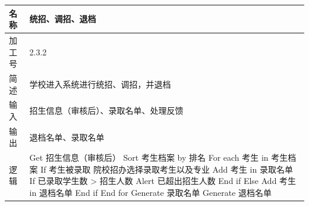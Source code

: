 \documentclass[CJK,utf8]{ctexrep}
\begin{document}
\begin{tabularx}{0.85\textwidth}{|l|X|}
	\hline
	\textbf{名称} & \textbf{统招、调招、退档} \\
	\hline
	加工号 & 2.3.2 \\
	\hline
	简述 & 学校进入系统进行统招、调招，并退档 \\
	\hline
	输入 & 招生信息（审核后）、录取名单、处理反馈 \\
	\hline
	输出 & 退档名单、录取名单 \\
	\hline
	\multirow{15}{*}{逻辑} & \ttfamily
	Get 招生信息（审核后） \newline
	Sort 考生档案 by 排名 \newline
	For each 考生 in 考生档案 \newline
	\hspace*{0.6cm}If 考生被录取 \newline
	\hspace*{1.2cm}院校招办选择录取考生以及专业 \newline
	\hspace*{1.2cm}Add 考生 in 录取名单 \newline
	\hspace*{1.2cm}If 已录取学生数 > 招生人数 \newline
	\hspace*{1.8cm}Alert 已超出招生人数 \newline
	\hspace*{1.2cm}End if \newline
	\hspace*{0.6cm}Else \newline
	\hspace*{1.2cm}Add 考生 in 退档名单 \newline
	\hspace*{0.6cm}End if \newline
	End for \newline
	Generate 录取名单 \newline
	Generate 退档名单 \\
	\hline
\end{tabularx}
\end{document}
